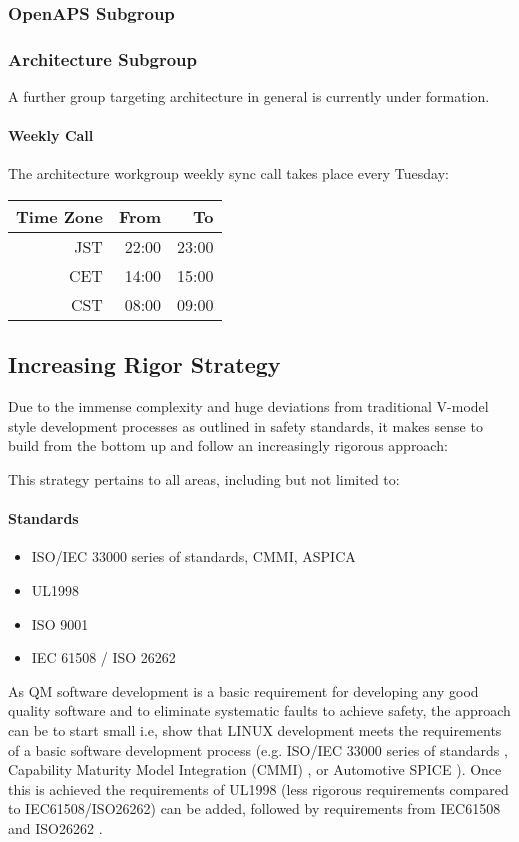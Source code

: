\documentclass[12pt]{../Common_files/ElisaPaper}
\begin{document}
\subsubsection{OpenAPS Subgroup}
\label{sssec:OpenAPS subgroup}
\subsubsection{Architecture Subgroup}
A further group targeting architecture in general is currently under formation.
\paragraph{Weekly Call}
The architecture workgroup weekly sync call takes place every Tuesday:

\begin{center}
\begin{tabular}{rrr}
	\toprule
	Time Zone & From & To\\
	\midrule
	JST & 22:00 & 23:00 \\
	CET	& 14:00 & 15:00 \\
	CST & 08:00 & 09:00 \\
	\bottomrule 
\end{tabular}
\end{center}

\subsection{Increasing Rigor Strategy}
Due to the immense complexity and huge deviations from traditional V-model style development processes as outlined in safety standards, it makes sense to build from the bottom up and follow an increasingly rigorous approach:

This strategy pertains to all areas, including but not limited to:
\paragraph{Standards}
\begin{itemize}
	\item ISO/IEC 33000 series of standards, CMMI, ASPICA \cite{ISO3300x:2015,CMMI,ASPICE}
	\item UL1998 \cite{UL1998}
	\item ISO 9001 \cite{ISO9001:2015}
	\item IEC 61508 / ISO 26262 \cite{IEC61508:2010,ISO26262:2018}
\end{itemize}
As QM software development is a basic requirement for developing any good quality software and to eliminate systematic faults to achieve safety, the approach can be to start small i.e, show that LINUX development meets the requirements of a basic software development process (e.g. ISO/IEC 33000 series of standards \cite{ISO3300x:2015}, Capability Maturity Model Integration (CMMI) \cite{CMMI}, or Automotive SPICE \cite{ASPICE}).
Once this is achieved the requirements of UL1998 \cite{UL1998} (less rigorous requirements compared to IEC61508/ISO26262) can be added, followed by requirements from IEC61508 and ISO26262 \cite{IEC61508:2010,ISO26262:2018}.
\end{document}
